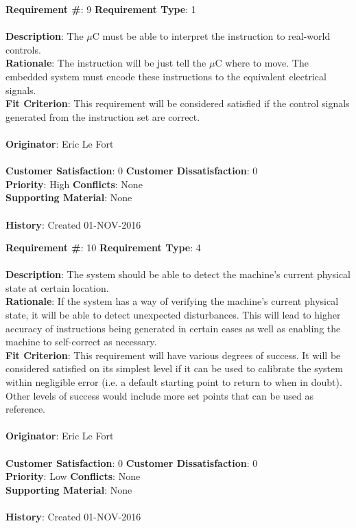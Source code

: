\documentclass[titlepage]{article}
\begin{document}
\begin{framed}
	\noindent\textbf{Requirement \#}: 9 \hfill \textbf{Requirement Type}: 1 \hfill\\\\
	\noindent\textbf{Description}: The $\mu$C must be able to interpret the instruction to real-world controls.\\
	\textbf{Rationale}: The instruction will be just tell the $\mu$C where to move. The embedded system must encode these instructions to the equivalent electrical signals.\\
	\textbf{Fit Criterion}: This requirement will be considered satisfied if the control signals generated from the instruction set are correct.\\\\
	\textbf{Originator}: Eric Le Fort\\\\
	\noindent\textbf{Customer Satisfaction}: 0 \hfill 	\textbf{Customer Dissatisfaction}: 0 \hfill\\
	\textbf{Priority}: High \hfill \textbf{Conflicts}: None \hfill\\
	\textbf{Supporting Material}: None\\\\
	\noindent\textbf{History}: Created 01-NOV-2016
\end{framed}

\newpage
\begin{framed}
	\noindent\textbf{Requirement \#}: 10 \hfill \textbf{Requirement Type}: 4 \hfill\\\\
	\noindent\textbf{Description}: The system should be able to detect the machine's current physical state at certain location.\\
	\textbf{Rationale}: If the system has a way of verifying the machine's current physical state, it will be able to detect unexpected disturbances. This will lead to higher accuracy of instructions being generated in certain cases as well as enabling the machine to self-correct as necessary.\\
	\textbf{Fit Criterion}: This requirement will have various degrees of success. It will be considered satisfied on its simplest level if it can be used to calibrate the system within negligible error (i.e. a default starting point to return to when in doubt). Other levels of success would include more set points that can be used as reference.\\\\
	\textbf{Originator}: Eric Le Fort\\\\
	\noindent\textbf{Customer Satisfaction}: 0 \hfill 	\textbf{Customer Dissatisfaction}: 0 \hfill\\
	\textbf{Priority}: Low \hfill \textbf{Conflicts}: None \hfill\\
	\textbf{Supporting Material}: None\\\\
	\noindent\textbf{History}: Created 01-NOV-2016
\end{framed}
\end{document}
